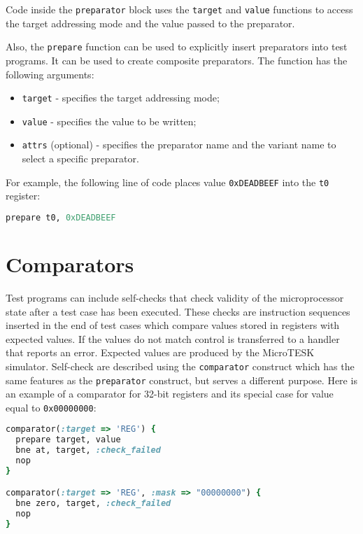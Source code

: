 \documentclass[oneside,final,12pt]{extreport}
\begin{document}
Code inside the {\tt preparator} block uses the {\tt target} and {\tt value} functions to
access the target addressing mode and the value passed to the preparator.

Also, the {\tt prepare} function can be used to explicitly insert preparators into test programs.
It can be used to create composite preparators. The function has the following arguments:

\begin{itemize}
\item {\tt target} - specifies the target addressing mode;
\item {\tt value} - specifies the value to be written;
\item {\tt attrs} (optional) - specifies the preparator name and the variant name to select
      a specific preparator.
\end{itemize}

For example, the following line of code places value {\tt 0xDEADBEEF} into the {\tt t0} register:

\begin{lstlisting}[language=ruby, emph={prepare}]
prepare t0, 0xDEADBEEF
\end{lstlisting}


\section{Comparators}

Test programs can include self-checks that check validity of the microprocessor state after
a test case has been executed. These checks are instruction sequences inserted in the end of
test cases which compare values stored in registers with expected values. If the values do not
match control is transferred to a handler that reports an error. Expected values are produced by
the MicroTESK simulator. Self-check are described using the  {\tt comparator} construct which has
the same features as the {\tt preparator} construct, but serves a different purpose. Here is
an example of a comparator for 32-bit registers and its special case for value equal to
{\tt 0x00000000}:

\begin{lstlisting}[language=ruby, emph={comparator, prepare}]
comparator(:target => 'REG') {
  prepare target, value
  bne at, target, :check_failed
  nop
}

comparator(:target => 'REG', :mask => "00000000") {
  bne zero, target, :check_failed
  nop
}
\end{lstlisting}
\end{document}
